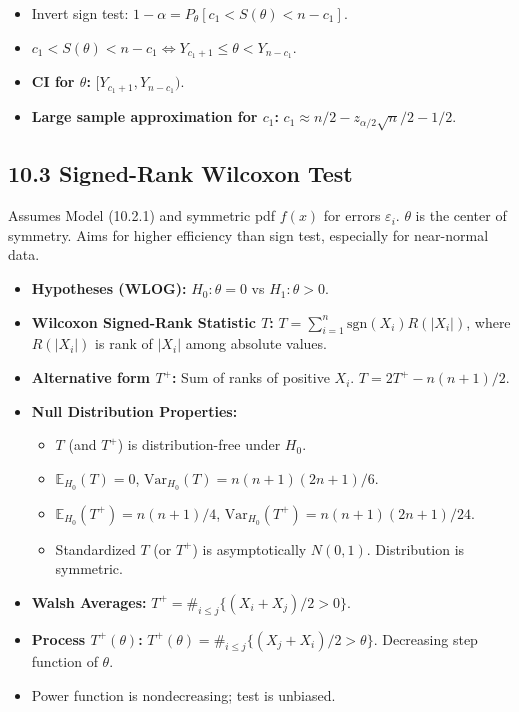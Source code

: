 \begin{itemize}
	\item Invert sign test: $1-\alpha = P_\theta[c_1 < S(\theta) < n-c_1]$.
	\item $c_1 < S(\theta) < n-c_1 \iff Y_{c_1+1} \le \theta < Y_{n-c_1}$.
	\item \textbf{CI for $\theta$:} $[Y_{c_1+1}, Y_{n-c_1})$.
	\item \textbf{Large sample approximation for $c_1$:} $c_1 \approx n/2 - z_{\alpha/2}\sqrt{n}/2 - 1/2$.
\end{itemize}

\subsection{10.3 Signed-Rank Wilcoxon Test}

Assumes Model (10.2.1) and symmetric pdf $f(x)$ for errors $\varepsilon_i$. $\theta$ is the center of symmetry.
Aims for higher efficiency than sign test, especially for near-normal data.

\begin{itemize}
	\item \textbf{Hypotheses (WLOG):} $H_0: \theta=0$ vs $H_1: \theta > 0$.
	\item \textbf{Wilcoxon Signed-Rank Statistic $T$:} $T = \sum_{i=1}^n \text{sgn}(X_i) R(|X_i|)$, where $R(|X_i|)$ is rank of $|X_i|$ among absolute values.
	\item \textbf{Alternative form $T^+$:} Sum of ranks of positive $X_i$. $T = 2T^+ - n(n+1)/2$.
	\item \textbf{Null Distribution Properties:}
	\begin{itemize}
		\item $T$ (and $T^+$) is distribution-free under $H_0$.
		\item $\mathbb{E}_{H_0}(T) = 0$, $\text{Var}_{H_0}(T) = n(n+1)(2n+1)/6$.
		\item $\mathbb{E}_{H_0}(T^+) = n(n+1)/4$, $\text{Var}_{H_0}(T^+) = n(n+1)(2n+1)/24$.
		\item Standardized $T$ (or $T^+$) is asymptotically $N(0,1)$. Distribution is symmetric.
	\end{itemize}
	\item \textbf{Walsh Averages:} $T^+ = \#_{i \le j} \{ (X_i+X_j)/2 > 0 \}$.
	\item \textbf{Process $T^+(\theta)$:} $T^+(\theta) = \#_{i \le j} \{ (X_j+X_i)/2 > \theta \}$. Decreasing step function of $\theta$.
	\item Power function is nondecreasing; test is unbiased.
\end{itemize}

